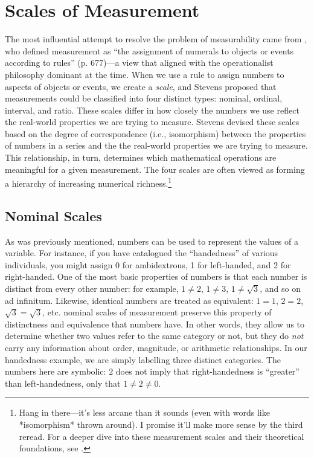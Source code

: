 \section{Scales of Measurement}

The most influential attempt to resolve the problem of measurability came from \textcite{Stevens1946}, who defined measurement as ``the assignment of numerals to objects or events according to rules'' (p. 677)—a view that aligned with the operationalist philosophy dominant at the time. When we use a rule to assign numbers to aspects of objects or events, we create a \textit{scale}, and Stevens proposed that measurements could be classified into four distinct types: nominal, ordinal, interval, and ratio. These scales differ in how closely the numbers we use reflect the real-world properties we are trying to measure. Stevens devised these scales based on the degree of correspondence (i.e., isomorphism) between the properties of numbers in a series and the the real-world properties we are trying to measure. This relationship, in turn, determines which mathematical operations are meaningful for a given measurement. The four scales are often viewed as forming a hierarchy of increasing numerical richness.\footnote{Hang in there—it’s less arcane than it sounds (even with words like *isomorphism* thrown around). I promise it’ll make more sense by the third reread. For a deeper dive into these measurement scales and their theoretical foundations, see \citeauthor{Stevens1951} \citeyear{Stevens1951}.}

\subsection{Nominal Scales}
\label{sec:nominal}

As was previously mentioned, numbers can be used to represent the values of a variable. For instance, if you have catalogued the ``handedness'' of various individuals, you might assign 0 for ambidextrous, 1 for left-handed, and 2 for right-handed. One of the most basic properties of numbers is that each number is distinct from every other number: for example, $1 \neq 2$, $1 \neq 3$, $1 \neq \sqrt{3}$, and so on ad infinitum. Likewise, identical numbers are treated as equivalent: $1 = 1$, $2 = 2$, $\sqrt{3} = \sqrt{3}$, etc. \Glspl{nominal scale} of measurement preserve this property of distinctness and equivalence that numbers have. In other words, they allow us to determine whether two values refer to the same category or not, but they do \textit{not} carry any information about order, magnitude, or arithmetic relationships. In our handedness example, we are simply labelling three distinct categories. The numbers here are symbolic: $2$ does not imply that right-handedness is ``greater'' than left-handedness, only that $1 \neq 2 \neq 0$.

